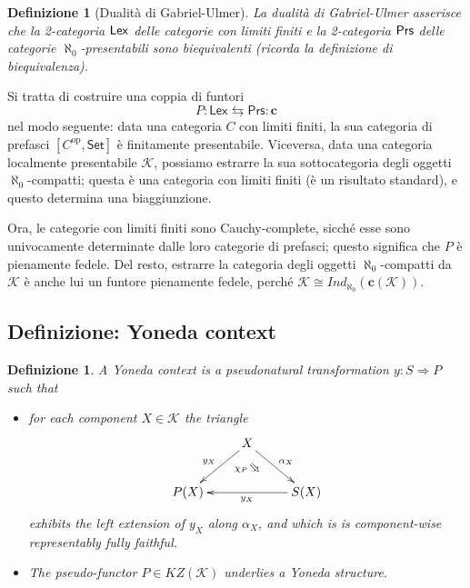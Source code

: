 \documentclass[11pt]{article}
\def\Set{\mathsf{Set}}
\def\To{\Rightarrow}
\newcommand{\Searrow}{\rotatebox[origin=c]{-45}{$\Rightarrow$}} %
\def\opp{\mathrm{op}}
\theoremstyle{reference}
\newtheorem{definition}[theorem]{Definizione}
\begin{document}
\begin{definition}[Dualità di Gabriel-Ulmer]
La dualità di Gabriel-Ulmer asserisce che la 2-categoria
$\sf Lex$ delle categorie con limiti finiti e la 2-categoria
$\sf Prs$ delle categorie $\aleph_0$\hyp{}presentabili sono
biequivalenti (ricorda la definizione di biequivalenza).
\end{definition}
Si tratta di costruire una coppia di funtori
$$
P : \mathsf{Lex} \leftrightarrows \mathsf{Prs} : \mathbf{c}
$$
nel modo seguente: data una categoria \(C\) con limiti finiti,
la sua categoria di prefasci \([C^\opp,\Set]\) è finitamente
presentabile. Viceversa, data una categoria localmente
presentabile \(\mathcal K\), possiamo estrarre la sua
sottocategoria degli oggetti \(\aleph_{\text{0}}\)-compatti; questa è una
categoria con limiti finiti (è un risultato standard), e
questo determina una biaggiunzione.

Ora, le categorie con limiti finiti sono Cauchy-complete,
sicché esse sono univocamente determinate dalle loro
categorie di prefasci; questo significa che \(P\) è pienamente
fedele. Del resto, estrarre la categoria degli oggetti
\(\aleph_{\text{0}}\)-compatti da \(\mathcal K\) è anche lui un funtore
pienamente fedele, perché \(\mathcal K \cong
Ind_\aleph_0(\mathbf{c}(\mathcal K))\).

\subsection{Definizione: Yoneda context}
\label{sec:orgac67393}

\begin{definition}
	A \emph{Yoneda context} is a pseudonatural transformation $y : S \To P$ such that
	\begin{itemize}
		\item for each component $X\in\mathcal K$ the triangle
		\[
			\vcenter{\xymatrix{
			& X \ar[dr]^{\alpha_X}\ar[dl]_{y_X}\ar@{}[d]|{\chi_{P}\Searrow}& \\
			P(X) && \ar[ll]^{y_X} S (X)
			}}
		\]
		exhibits the left extension of $y_X$ along $\alpha_X$, and which is is component-wise representably fully faithful.
		\item The pseudo\hyp{}functor $P\in KZ(\mathcal K)$ underlies a Yoneda structure.
	\end{itemize}
\end{definition}
\end{document}
